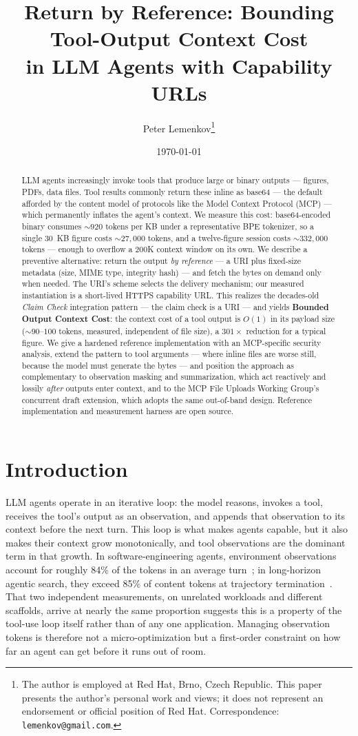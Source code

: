 \documentclass[11pt]{article}
\title{Return by Reference: Bounding Tool-Output Context Cost\\
in LLM Agents with Capability URLs}
\author{Peter Lemenkov\thanks{The author is employed at Red Hat, Brno, Czech
Republic. This paper presents the author's personal work and views; it does not
represent an endorsement or official position of Red Hat.  Correspondence:
\texttt{lemenkov@gmail.com}.}}
\date{\today}
\newcommand{\bref}{by reference}
\begin{document}
\maketitle

\begin{abstract}
LLM agents increasingly invoke tools that produce large or binary outputs --- figures, PDFs, data files. Tool results commonly return these inline as base64 --- the default afforded by the content model of protocols like the Model Context Protocol (MCP) --- which permanently inflates the agent's context. We measure this cost: base64-encoded binary consumes ${\sim}920$ tokens per KB under a representative BPE tokenizer, so a single 30~KB figure costs ${\sim}27{,}000$ tokens, and a twelve-figure session costs ${\sim}332{,}000$ tokens --- enough to overflow a 200K context window on its own. We describe a preventive alternative: return the output \emph{\bref{}} --- a URI plus fixed-size metadata (size, MIME type, integrity hash) --- and fetch the bytes on demand only when needed. The URI's scheme selects the delivery mechanism; our measured instantiation is a short-lived HTTPS capability URL. This realizes the decades-old \emph{Claim Check} integration pattern --- the claim check is a URI --- and yields \textbf{Bounded Output Context Cost}: the context cost of a tool output is $O(1)$ in its payload size (${\sim}90$--$100$ tokens, measured, independent of file size), a $301\times$ reduction for a typical figure. We give a hardened reference implementation with an MCP-specific security analysis, extend the pattern to tool arguments --- where inline files are worse still, because the model must generate the bytes --- and position the approach as complementary to observation masking and summarization, which act reactively and lossily \emph{after} outputs enter context, and to the MCP File Uploads Working Group's concurrent draft extension, which adopts the same out-of-band design. Reference implementation and measurement harness are open source.
\end{abstract}

\section{Introduction}\label{sec:intro}

LLM agents operate in an iterative loop: the model reasons, invokes a tool, receives the tool's output as an observation, and appends that observation to its context before the next turn. This loop is what makes agents capable, but it also makes their context grow monotonically, and tool observations are the dominant term in that growth. In software-engineering agents, environment observations account for roughly 84\% of the tokens in an average turn~\citep{complexitytrap}; in long-horizon agentic search, they exceed 85\% of content tokens at trajectory termination~\citep{regimemap}. That two independent measurements, on unrelated workloads and different scaffolds, arrive at nearly the same proportion suggests this is a property of the tool-use loop itself rather than of any one application. Managing observation tokens is therefore not a micro-optimization but a first-order constraint on how far an agent can get before it runs out of
room.
\end{document}
